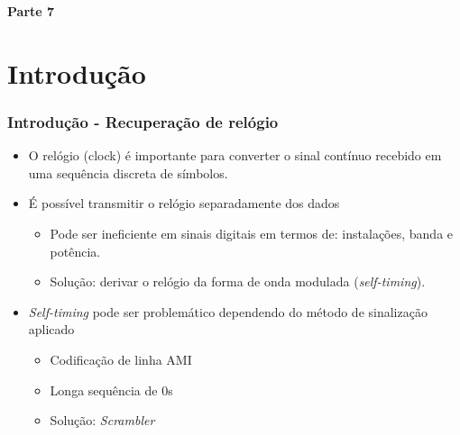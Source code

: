 
\begin{frame}
	\begin{block}{\centering\large\bfseries Parte 7}
		\centering\large\insertpart
	\end{block}
\end{frame}


\section{Introdução}

\begin{frame}
	\frametitle{Introdução - Recuperação de relógio}

	\begin{itemize}
	    \item O relógio (clock) é importante para converter o sinal contínuo recebido em uma sequência discreta de símbolos.
	    \item É possível transmitir o relógio separadamente dos dados
	    \begin{itemize}
	    	\item Pode ser ineficiente em sinais digitais em termos de: instalações, banda e potência.
	    	\item Solução: derivar o relógio da forma de onda modulada (\textit{self-timing}).
	    \end{itemize}
    \item \textit{Self-timing} pode ser problemático dependendo do método de sinalização aplicado
    \begin{itemize}
    	\item Codificação de linha AMI
    	\item Longa sequência de 0s
    	\item Solução: \textit{Scrambler}
    \end{itemize}
	\end{itemize}			
\end{frame}

